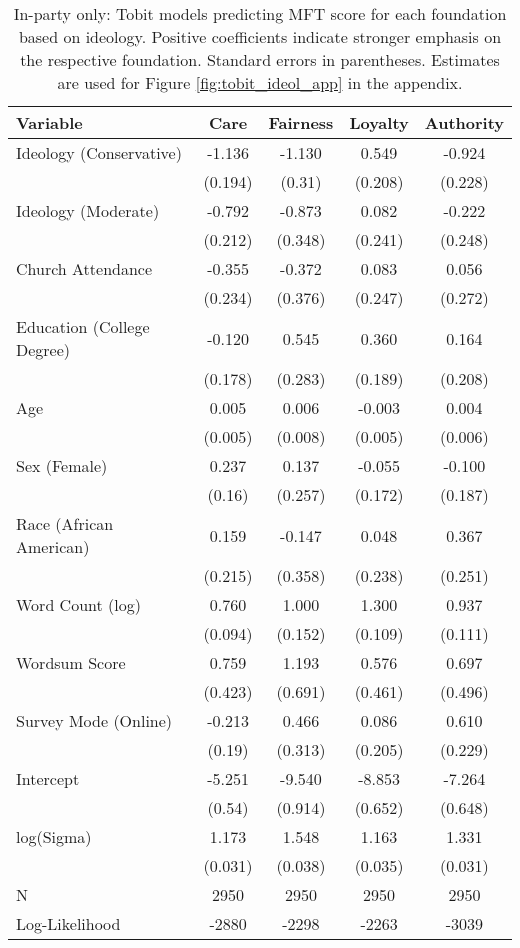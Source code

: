 \begin{table}[ht]
\centering
\caption{In-party only: Tobit models predicting MFT score for each foundation based 
           on ideology. Positive coefficients indicate stronger emphasis on the respective 
           foundation. Standard errors in parentheses. Estimates are used for 
           Figure \ref{fig:tobit_ideol_app} in the appendix.} 
\label{tab:tobit_in}
\begingroup\footnotesize
\begin{tabular}{lcccc}
  \hline
Variable & Care & Fairness & Loyalty & Authority \\ 
  \hline
Ideology (Conservative) & -1.136 & -1.130 &  0.549 & -0.924 \\ 
   & (0.194) & (0.31) & (0.208) & (0.228) \\ 
  Ideology (Moderate) & -0.792 & -0.873 &  0.082 & -0.222 \\ 
   & (0.212) & (0.348) & (0.241) & (0.248) \\ 
  Church Attendance & -0.355 & -0.372 &  0.083 &  0.056 \\ 
   & (0.234) & (0.376) & (0.247) & (0.272) \\ 
  Education (College Degree) & -0.120 &  0.545 &  0.360 &  0.164 \\ 
   & (0.178) & (0.283) & (0.189) & (0.208) \\ 
  Age &  0.005 &  0.006 & -0.003 &  0.004 \\ 
   & (0.005) & (0.008) & (0.005) & (0.006) \\ 
  Sex (Female) &  0.237 &  0.137 & -0.055 & -0.100 \\ 
   & (0.16) & (0.257) & (0.172) & (0.187) \\ 
  Race (African American) &  0.159 & -0.147 &  0.048 &  0.367 \\ 
   & (0.215) & (0.358) & (0.238) & (0.251) \\ 
  Word Count (log) &  0.760 &  1.000 &  1.300 &  0.937 \\ 
   & (0.094) & (0.152) & (0.109) & (0.111) \\ 
  Wordsum Score &  0.759 &  1.193 &  0.576 &  0.697 \\ 
   & (0.423) & (0.691) & (0.461) & (0.496) \\ 
  Survey Mode (Online) & -0.213 &  0.466 &  0.086 &  0.610 \\ 
   & (0.19) & (0.313) & (0.205) & (0.229) \\ 
  Intercept & -5.251 & -9.540 & -8.853 & -7.264 \\ 
   & (0.54) & (0.914) & (0.652) & (0.648) \\ 
  log(Sigma) &  1.173 &  1.548 &  1.163 &  1.331 \\ 
   & (0.031) & (0.038) & (0.035) & (0.031) \\ 
   \hline
N & 2950 & 2950 & 2950 & 2950 \\ 
  Log-Likelihood & -2880 & -2298 & -2263 & -3039 \\ 
   \hline
\end{tabular}
\endgroup
\end{table}
